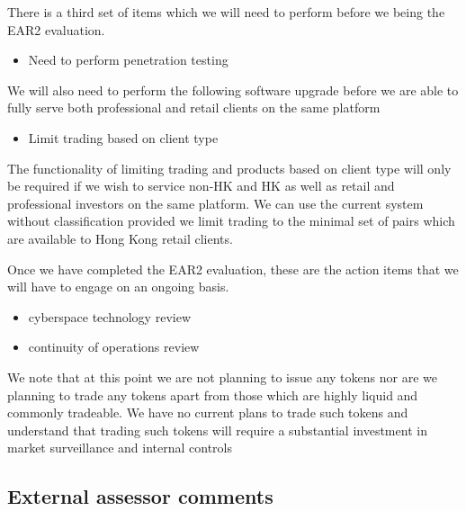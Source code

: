 \documentclass[]{report}
\begin{document}
There is a third set of items which we will need to perform
before we being the EAR2 evaluation.

\begin{itemize}
\item Need to perform penetration testing
\end{itemize}

We will also need to perform the following software upgrade before we
are able to fully serve both professional and retail clients on the
same platform
\begin{itemize}
\item Limit trading based on client type
\end{itemize}
The functionality of limiting trading and products based on client
type will only be required if we wish to service non-HK and HK as well
as retail and professional investors on the same platform.  We can use
the current system without classification provided we limit trading to
the minimal set of pairs which are available to Hong Kong retail clients.

Once we have completed the EAR2 evaluation, these are the action items
that we will have to engage on an ongoing basis.

\begin{itemize}
\item cyberspace technology review
\item continuity of operations review
\end{itemize}

We note that at this point we are not planning to issue any tokens nor
are we planning to trade any tokens apart from those which are highly
liquid and commonly tradeable.  We have no current plans to trade such
tokens and understand that trading such tokens will require a
substantial investment in market surveillance and internal controls

\subsection{External assessor comments}
\end{document}
